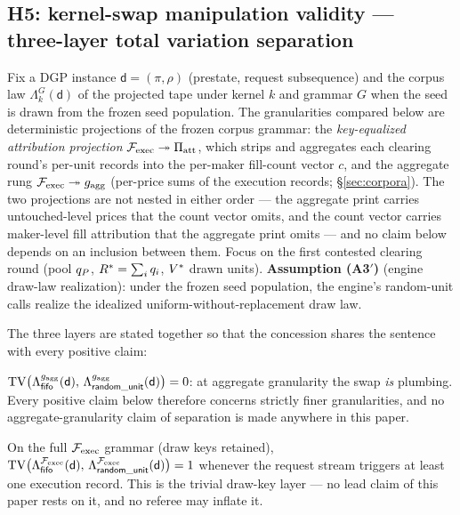 
\subsection{H5: kernel-swap manipulation validity --- three-layer total
variation separation}
\label{sec:h5}

Fix a DGP instance $\mathsf{d} = (\pi, \rho)$ (prestate, request
subsequence) and the corpus law $\Lambda^{G}_{k}(\mathsf{d})$ of the
projected tape under kernel $k$ and grammar $G$ when the seed is drawn from
the frozen seed population. The granularities compared below are
deterministic projections of the frozen corpus grammar: the
\emph{key-equalized attribution projection}
$\mathcal{F}_{\mathrm{exec}} \twoheadrightarrow \Pi_{\mathrm{att}}$, which strips
 and aggregates each clearing round's per-unit
records into the per-maker fill-count vector $c$, and the aggregate rung
$\mathcal{F}_{\mathrm{exec}} \twoheadrightarrow g_{\mathrm{agg}}$ (per-price sums of the execution records;
\S\ref{sec:corpora}). The two projections are not nested in either order
--- the aggregate print carries untouched-level prices that the count
vector omits, and the count vector carries maker-level fill attribution
that the aggregate print omits --- and no claim below depends on an
inclusion between them. Focus on the first
contested clearing round (pool $q_{P}$, $R^{*} = \sum_i q_i$, $V^{*}$ drawn
units). \textbf{Assumption (A3$'$)} (engine draw-law realization): under the
frozen seed population, the engine's random-unit calls realize the idealized
uniform-without-replacement draw law.

The three layers are stated together so that the concession shares the
sentence with every positive claim:

\begin{lemma}
\label{lem:h5-a}
$\operatorname{TV}\!\big(\Lambda^{g_{\mathrm{agg}}}_{\mathsf{fifo}}(\mathsf{d}),\,
\Lambda^{g_{\mathrm{agg}}}_{\mathsf{random\_unit}}(\mathsf{d})\big) = 0$: at aggregate granularity the swap
\emph{is} plumbing. Every positive claim below therefore concerns strictly
finer granularities, and no aggregate-granularity claim of separation is
made anywhere in this paper.
\end{lemma}


\begin{lemma}
\label{lem:h5-b}
On the full $\mathcal{F}_{\mathrm{exec}}$ grammar (draw keys retained),
$\operatorname{TV}\!\big(\Lambda^{\mathcal{F}_{\mathrm{exec}}}_{\mathsf{fifo}}(\mathsf{d}),\,
\Lambda^{\mathcal{F}_{\mathrm{exec}}}_{\mathsf{random\_unit}}(\mathsf{d})\big) = 1$ whenever the request stream triggers at
least one execution record. This is the trivial draw-key layer --- no lead
claim of this paper rests on it, and no referee may inflate it.
\end{lemma}


